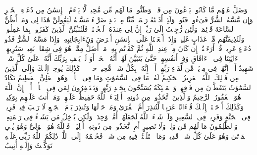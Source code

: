 \stopbuffer
\startbuffer[\q:41:48]
وَضَلَّ عَنۡهُم مَّا كَانُوا۟ یَدۡعُونَ مِن قَبۡلُۖ وَظَنُّوا۟ مَا لَهُم مِّن مَّحِیصࣲ%
\stopbuffer
\startbuffer[\q:41:49]
لَّا یَسۡءَمُ ٱلۡإِنسَٰنُ مِن دُعَاۤءِ ٱلۡخَیۡرِ وَإِن مَّسَّهُ ٱلشَّرُّ فَیَءُوسࣱ قَنُوطࣱ%
\stopbuffer
\startbuffer[\q:41:50]
وَلَئِنۡ أَذَقۡنَٰهُ رَحۡمَةࣰ مِّنَّا مِنۢ بَعۡدِ ضَرَّاۤءَ مَسَّتۡهُ لَیَقُولَنَّ هَٰذَا لِی وَمَاۤ أَظُنُّ ٱلسَّاعَةَ قَاۤئِمَةࣰ وَلَئِن رُّجِعۡتُ إِلَىٰ رَبِّیۤ إِنَّ لِی عِندَهُۥ لَلۡحُسۡنَىٰۚ فَلَنُنَبِّئَنَّ ٱلَّذِینَ كَفَرُوا۟ بِمَا عَمِلُوا۟ وَلَنُذِیقَنَّهُم مِّنۡ عَذَابٍ غَلِیظࣲ%
\stopbuffer
\startbuffer[\q:41:51]
وَإِذَاۤ أَنۡعَمۡنَا عَلَى ٱلۡإِنسَٰنِ أَعۡرَضَ وَنَءَابِجَانِبِهِۦ وَإِذَا مَسَّهُ ٱلشَّرُّ فَذُو دُعَاۤءٍ عَرِیضࣲ%
\stopbuffer
\startbuffer[\q:41:52]
قُلۡ أَرَءَیۡتُمۡ إِن كَانَ مِنۡ عِندِ ٱللَّهِ ثُمَّ كَفَرۡتُم بِهِۦ مَنۡ أَضَلُّ مِمَّنۡ هُوَ فِی شِقَاقِۭ بَعِیدࣲ%
\stopbuffer
\startbuffer[\q:41:53]
سَنُرِیهِمۡ ءَایَٰتِنَا فِی ٱلۡءَافَاقِ وَفِیۤ أَنفُسِهِمۡ حَتَّىٰ یَتَبَیَّنَ لَهُمۡ أَنَّهُ ٱلۡحَقُّۗ أَوَ لَمۡ یَكۡفِ بِرَبِّكَ أَنَّهُۥ عَلَىٰ كُلِّ شَیۡءࣲ شَهِیدٌ%
\stopbuffer
\startbuffer[\q:41:54]
أَلَاۤ إِنَّهُمۡ فِی مِرۡیَةࣲ مِّن لِّقَاۤءِ رَبِّهِمۡۗ أَلَاۤ إِنَّهُۥ بِكُلِّ شَیۡءࣲ مُّحِیطُۢ%
\stopbuffer
\startbuffer[\q:42:1]
حمۤ%
\stopbuffer
\startbuffer[\q:42:2]
عۤسۤقۤ%
\stopbuffer
\startbuffer[\q:42:3]
كَذَٰلِكَ یُوحِیۤ إِلَیۡكَ وَإِلَى ٱلَّذِینَ مِن قَبۡلِكَ ٱللَّهُ ٱلۡعَزِیزُ ٱلۡحَكِیمُ%
\stopbuffer
\startbuffer[\q:42:4]
لَهُۥ مَا فِی ٱلسَّمَٰوَٰتِ وَمَا فِی ٱلۡأَرۡضِۖ وَهُوَ ٱلۡعَلِیُّ ٱلۡعَظِیمُ%
\stopbuffer
\startbuffer[\q:42:5]
تَكَادُ ٱلسَّمَٰوَٰتُ یَتَفَطَّرۡنَ مِن فَوۡقِهِنَّۚ وَٱلۡمَلَٰۤئِكَةُ یُسَبِّحُونَ بِحَمۡدِ رَبِّهِمۡ وَیَسۡتَغۡفِرُونَ لِمَن فِی ٱلۡأَرۡضِۗ أَلَاۤ إِنَّ ٱللَّهَ هُوَ ٱلۡغَفُورُ ٱلرَّحِیمُ%
\stopbuffer
\startbuffer[\q:42:6]
وَٱلَّذِینَ ٱتَّخَذُوا۟ مِن دُونِهِۦۤ أَوۡلِیَاۤءَ ٱللَّهُ حَفِیظٌ عَلَیۡهِمۡ وَمَاۤ أَنتَ عَلَیۡهِم بِوَكِیلࣲ%
\stopbuffer
\startbuffer[\q:42:7]
وَكَذَٰلِكَ أَوۡحَیۡنَاۤ إِلَیۡكَ قُرۡءَانًا عَرَبِیࣰّا لِّتُنذِرَ أُمَّ ٱلۡقُرَىٰ وَمَنۡ حَوۡلَهَا وَتُنذِرَ یَوۡمَ ٱلۡجَمۡعِ لَا رَیۡبَ فِیهِۚ فَرِیقࣱ فِی ٱلۡجَنَّةِ وَفَرِیقࣱ فِی ٱلسَّعِیرِ%
\stopbuffer
\startbuffer[\q:42:8]
وَلَوۡ شَاۤءَ ٱللَّهُ لَجَعَلَهُمۡ أُمَّةࣰ وَٰحِدَةࣰ وَلَٰكِن یُدۡخِلُ مَن یَشَاۤءُ فِی رَحۡمَتِهِۦۚ وَٱلظَّٰلِمُونَ مَا لَهُم مِّن وَلِیࣲّ وَلَا نَصِیرٍ%
\stopbuffer
\startbuffer[\q:42:9]
أَمِ ٱتَّخَذُوا۟ مِن دُونِهِۦۤ أَوۡلِیَاۤءَۖ فَٱللَّهُ هُوَ ٱلۡوَلِیُّ وَهُوَ یُحۡیِ ٱلۡمَوۡتَىٰ وَهُوَ عَلَىٰ كُلِّ شَیۡءࣲ قَدِیرࣱ%
\stopbuffer
\startbuffer[\q:42:10]
وَمَا ٱخۡتَلَفۡتُمۡ فِیهِ مِن شَیۡءࣲ فَحُكۡمُهُۥۤ إِلَى ٱللَّهِۚ ذَٰلِكُمُ ٱللَّهُ رَبِّی عَلَیۡهِ تَوَكَّلۡتُ وَإِلَیۡهِ أُنِیبُ%
